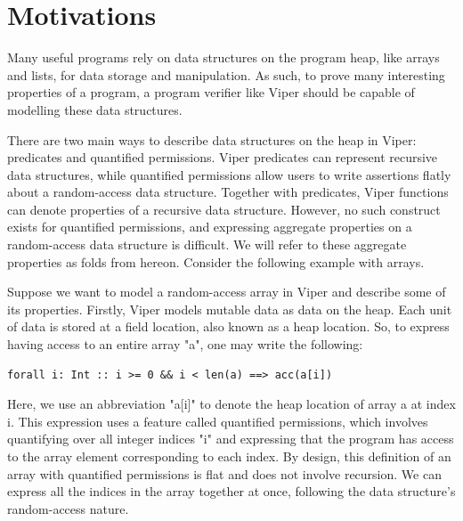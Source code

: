 \documentclass[msc,oneside]{ubcthesis}
\theoremstyle{definition}
\begin{document}


\mainmatter


\chapter{Motivations}
Many useful programs rely on data structures on the program heap, like arrays and lists, for data storage and manipulation. As such, to prove many interesting properties of a program, a program verifier like Viper should be capable of modelling these data structures. 

There are two main ways to describe data structures on the heap in Viper: predicates and quantified permissions. Viper predicates can represent recursive data structures, while quantified permissions allow users to write assertions flatly about a random-access data structure. Together with predicates, Viper functions can denote properties of a recursive data structure. However, no such construct exists for quantified permissions, and expressing aggregate properties on a random-access data structure is difficult. We will refer to these aggregate properties as folds from hereon. Consider the following example with arrays.

Suppose we want to model a random-access array in Viper and describe some of its properties. Firstly, Viper models mutable data as data on the heap. Each unit of data is stored at a field location, also known as a heap location. So, to express having access to an entire array "a", one may write the following:
\begin{lstlisting}
forall i: Int :: i >= 0 && i < len(a) ==> acc(a[i])
\end{lstlisting}
Here, we use an abbreviation "a[i]" to denote the heap location of array a at index i. This expression uses a feature called quantified permissions, which involves quantifying over all integer indices "i" and expressing that the program has access to the array element corresponding to each index. By design, this definition of an array with quantified permissions is flat and does not involve recursion. We can express all the indices in the array together at once, following the data structure’s random-access nature. 
\end{document}
